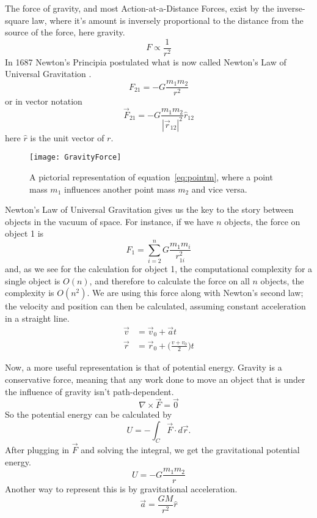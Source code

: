 The force of gravity, and most Action-at-a-Distance Forces, exist by the inverse-square law, where it's amount is inversely proportional to the distance from the source of the force, here gravity. $$F\propto \frac{1}{r^2}$$ In 1687 Newton's Principia postulated what is now called Newton's Law of Universal Gravitation \cite{rohrlich_1999}. $$F_{21}=-G\frac{m_1m_2}{r^2}$$ or in vector notation 
\begin{equation}\label{eq:pointm}
\vec{F}_{21}=-G\frac{m_1m_2}{|\vec{r}_{12}|^2}\hat{r}_{12}
\end{equation}
 here $\hat{r}$ is the unit vector of $r$.
 
 \begin{figure}
 	\centering
 	\texttt{[image: GravityForce]}
 	\caption{A pictorial representation of equation~\ref{eq:pointm}, where a point mass $m_1$ influences another point mass $m_2$ and vice versa.}
 \end{figure}

Newton's Law of Universal Gravitation gives us the key to the story between objects in the vacuum of space. For instance, if we have $n$ objects, the force on object 1 is $$F_1=\sum_{i=2}^n{G\frac{m_1 m_i}{r_{1i}^2}}$$ and, as we see for the calculation for object 1, the computational complexity for a single object is $O(n)$, and therefore to calculate the force on all $n$ objects, the complexity is $O(n^2)$. We are using this force along with Newton's second law; the velocity and position can then be calculated, assuming constant acceleration in a straight line.
\begin{align}
	\vec{v} &= \vec{v}_0+\vec{a}t \label{eq:vel}\\
	\vec{r} &= \vec{r}_0+\Big(\frac{v+v_0}{2}\Big)t\label{eq:pos}
\end{align}

Now, a more useful representation is that of potential energy. Gravity is a conservative force, meaning that any work done to move an object that is under the influence of gravity isn't path-dependent. $$\nabla\times \vec{F}=\vec{0}$$ 
So the potential energy can be calculated by $$U=-\int_C \vec{F}\cdot d\vec{r}.$$ After plugging in $\vec{F}$ and solving the integral, we get the gravitational potential energy.
\begin{equation} \label{eq:gravpotential}
U=-G\frac{m_1m_2}{r}
\end{equation}
Another way to represent this is by gravitational acceleration. 
\begin{equation}
\vec{a}=\frac{GM}{r^2}\hat{r}
\end{equation}

